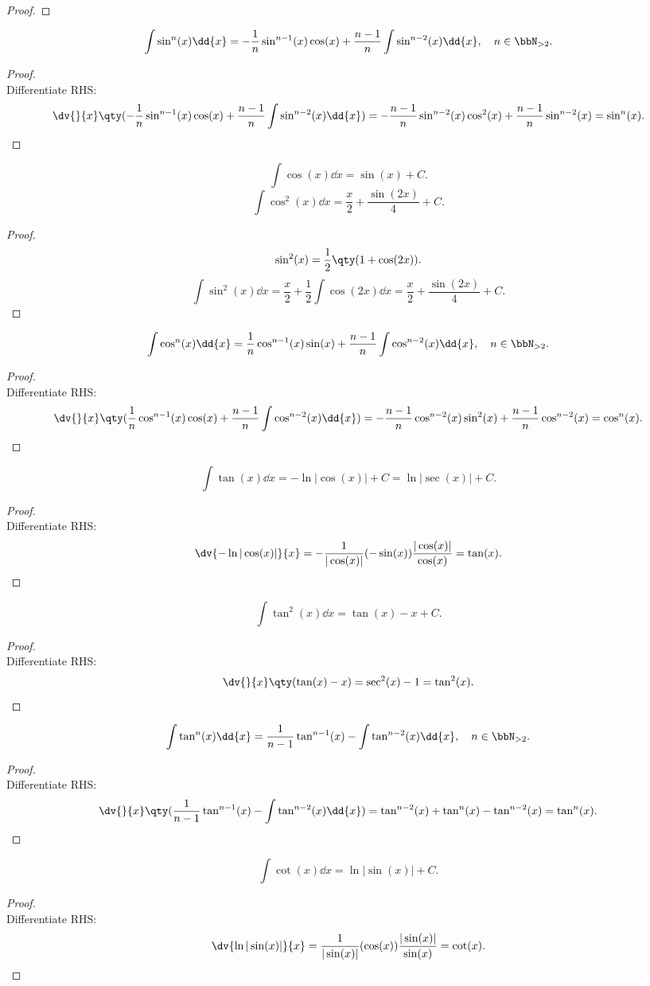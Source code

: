 \documentclass[a4paper,12pt]{report}
\begin{document}
\begin{itemize}
\begin{itemize}
\begin{proof}
\end{proof}
\[\int\sin^n(x)\dd{x}=-\frac{1}{n}\sin^{n-1}(x)\cos(x)+\frac{n-1}{n}\int\sin^{n-2}(x)\dd{x},\quad n\in\bbN_{>2}.\]
\begin{proof}\mbox{}\\
    Differentiate RHS:
    \[\dv{}{x}\qty(-\frac{1}{n}\sin^{n-1}(x)\cos(x)+\frac{n-1}{n}\int\sin^{n-2}(x)\dd{x})=-\frac{n-1}{n}\sin^{n-2}(x)\cos^2(x)+\frac{n-1}{n}\sin^{n-2}(x)=\sin^n(x).\]
\end{proof}
\[\int\cos(x)\dd{x}=\sin(x)+C.\]
\[\int\cos^2(x)\dd{x}=\frac{x}{2}+\frac{\sin(2x)}{4}+C.\]
\begin{proof}
    \[\sin^2(x)=\frac{1}{2}\qty(1+\cos(2x)).\]
    \[\int\sin^2(x)\dd{x}=\frac{x}{2}+\frac{1}{2}\int\cos(2x)\dd{x}=\frac{x}{2}+\frac{\sin(2x)}{4}+C.\]
\end{proof}
\[\int\cos^n(x)\dd{x}=\frac{1}{n}\cos^{n-1}(x)\sin(x)+\frac{n-1}{n}\int\cos^{n-2}(x)\dd{x},\quad n\in\bbN_{>2}.\]
\begin{proof}\mbox{}\\
    Differentiate RHS:
    \[\dv{}{x}\qty(\frac{1}{n}\cos^{n-1}(x)\cos(x)+\frac{n-1}{n}\int\cos^{n-2}(x)\dd{x})=-\frac{n-1}{n}\cos^{n-2}(x)\sin^2(x)+\frac{n-1}{n}\cos^{n-2}(x)=\cos^n(x).\]
\end{proof}
\[\int\tan(x)\dd{x}=-\ln|\cos(x)|+C=\ln|\sec(x)|+C.\]
\begin{proof}\mbox{}\\
    Differentiate RHS:
    \[\dv{-\ln|\cos(x)|}{x}=-\frac{1}{|\cos(x)|}(-\sin(x))\frac{|\cos(x)|}{\cos(x)}=\tan(x).\]
\end{proof}
\[\int\tan^2(x)\dd{x}=\tan(x)-x+C.\]
\begin{proof}\mbox{}\\
    Differentiate RHS:
    \[\dv{}{x}\qty(\tan(x)-x)=\sec^2(x)-1=\tan^2(x).\]
\end{proof}
\[\int\tan^n(x)\dd{x}=\frac{1}{n-1}\tan^{n-1}(x)-\int\tan^{n-2}(x)\dd{x},\quad n\in\bbN_{>2}.\]
\begin{proof}\mbox{}\\
    Differentiate RHS:
    \[\dv{}{x}\qty(\frac{1}{n-1}\tan^{n-1}(x)-\int\tan^{n-2}(x)\dd{x})=\tan^{n-2}(x)+\tan^n(x)-\tan^{n-2}(x)=\tan^n(x).\]
\end{proof}
\[\int\cot(x)\dd{x}=\ln|\sin(x)|+C.\]
\begin{proof}\mbox{}\\
    Differentiate RHS:
    \[\dv{\ln|\sin(x)|}{x}=\frac{1}{|\sin(x)|}(\cos(x))\frac{|\sin(x)|}{\sin(x)}=\cot(x).\]

\end{proof}
\end{itemize}
\end{itemize}
\end{document}
